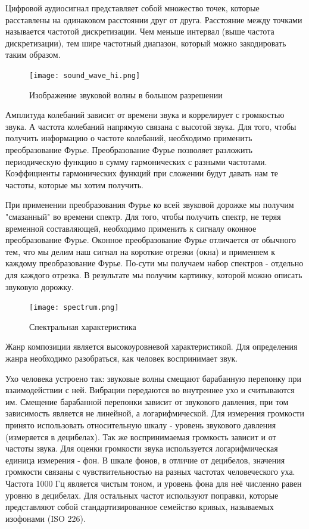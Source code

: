 Цифровой аудиосигнал представляет собой множество точек, которые расставлены на одинаковом расстоянии друг от друга. Расстояние между точками называется частотой дискретизации. Чем меньше интервал (выше частота дискретизации), тем шире частотный диапазон, который можно закодировать таким образом.

\begin{figure}
\centering
	\texttt{[image: sound\_wave\_hi.png]}
	\caption{Изображение звуковой волны в большом разрешении}
	\label{sec:analysus:sound_wave_hi}
\end{figure}

Амплитуда колебаний зависит от времени звука и коррелирует с громкостью звука. А частота колебаний напрямую связана с высотой звука. Для того, чтобы получить информацию о частоте колебаний, необходимо применить преобразование Фурье. Преобразование Фурье позволяет разложить периодическую функцию в сумму гармонических с разными частотами. Коэффициенты гармонических функций при сложении будут давать нам те частоты, которые мы хотим получить.

При применении преобразования Фурье ко всей звуковой дорожке мы получим "смазанный" во времени спектр. Для того, чтобы получить спектр, не теряя временной составляющей, необходимо применить к сигналу оконное преобразование Фурье. Оконное преобразование Фурье отличается от обычного тем, что мы делим наш сигнал на короткие отрезки (окна) и применяем к каждому преобразование Фурье. По-сути мы получаем набор спектров - отдельно для каждого отрезка. В результате мы получим картинку, которой можно описать звуковую дорожку.

\begin{figure}
\centering
	\texttt{[image: spectrum.png]}
	\caption{Спектральная характеристика}
	\label{sec:analysus:spectrum}
\end{figure}

Жанр композиции является высокоуровневой характеристикой. Для определения жанра необходимо разобраться, как человек воспринимает звук.

Ухо человека устроено так: звуковые волны смещают барабанную перепонку при взаимодействии с ней. Вибрации передаются во внутреннее ухо и считываются им. Смещение барабанной перепонки зависит от звукового давления, при том зависимость является не линейной, а логарифмической. Для измерения громкости принято использовать относительную шкалу - уровень звукового давления (измеряется в децибелах). Так же воспринимаемая громкость зависит и от частоты звука. Для оценки громкости звука используется логарифмическая единица измерения - фон. В шкале фонов, в отличие от децибелов, значения громкости связаны с чувствительностью на разных частотах человеческого уха. Частота 1000 Гц является чистым тоном, и уровень фона для неё численно равен уровню в децибелах. Для остальных частот используют поправки, которые представляют собой стандартизированное семейство кривых, называемых изофонами (ISO 226).

